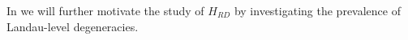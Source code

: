 \documentclass[aps, prb, showpacs, twocolumn, notitlepage, superscriptaddress]{revtex4-1}
\begin{document}
In  we will further motivate the study of $H_{RD}$ by investigating the prevalence of Landau-level degeneracies. 







\end{document}
